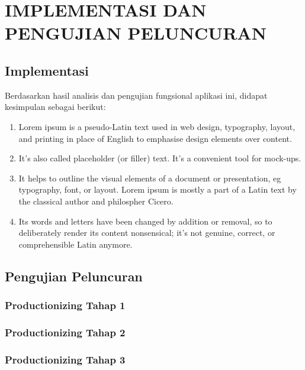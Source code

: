 
\chapter{IMPLEMENTASI DAN PENGUJIAN PELUNCURAN}

\section{Implementasi}
	Berdasarkan hasil analisis dan pengujian fungsional aplikasi ini, didapat kesimpulan sebagai berikut:

	\begin{enumerate}
		\item Lorem ipsum is a pseudo-Latin text used in web design, typography, layout, and printing in place of English to emphasise design elements over content. 
		
		\item It's also called placeholder (or filler) text. It's a convenient tool for mock-ups. 
		
		\item It helps to outline the visual elements of a document or presentation, eg typography, font, or layout. Lorem ipsum is mostly a part of a Latin text by the classical author and philospher Cicero.

		\item Its words and letters have been changed by addition or removal, so to deliberately render its content nonsensical; it's not genuine, correct, or comprehensible Latin anymore. 
	\end{enumerate}

\section{Pengujian Peluncuran}
	\subsection{Productionizing Tahap 1}
	\subsection{Productionizing Tahap 2}
	\subsection{Productionizing Tahap 3}
	
\begin{comment}

\end{comment}
